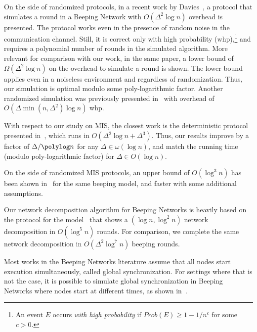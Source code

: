 On the side of randomized protocols, in a recent work by Davies~\cite{davies2023optimal}, a protocol that simulates a \congest round in a Beeping Network with $O(\Delta^2\log n)$ overhead is presented. The protocol works even in the presence of random noise in the communication channel. Still, it is correct only with high probability (whp),\footnote{An event $E$ occurs \emph{with high probability} if $Prob(E)\geq 1-1/n^c$ for some $c>0$.} and requires a polynomial number of \congest rounds in the simulated algorithm.   
More relevant for comparison with our work, in the same paper, a lower bound of $\Omega(\Delta^2 \log n)$ on the overhead to simulate a \congest round is shown. The lower bound applies even in a noiseless environment and regardless of randomization. 
Thus, our simulation is optimal modulo some poly-logarithmic factor. 
%
Another randomized simulation was previously presented in~\cite{ashkenazi2020brief} with overhead of $O(\Delta\min(n,\Delta^2)\log n)$ whp.



With respect to our study on MIS, the closest work is the deterministic protocol presented in~\cite{beauquier2018fast}, which runs in $O(\Delta^2 \log n + \Delta^3)$. Thus, our results improve by a factor of $\Delta/\polylog n$ for any $\Delta\in \omega(\log n)$, and match the running time (modulo poly-logarithmic factor) for $\Delta\in O(\log n)$. 

On the side of randomized MIS protocols, an upper bound of $O(\log^3 n)$ has been shown in~\cite{afek2013beeping} for the same beeping model, and faster with some additional assumptions.

Our network decomposition algorithm for Beeping Networks is heavily based on the protocol for the \congest model~\cite{ghaffari2021improved} that shows a $(\log n, \log^2 n)$ network decomposition in $O(\log^5 n)$ \congest rounds. For comparison, we complete the same network decomposition in $O(\Delta^2 \log^7 n)$ beeping rounds.

Most works in the Beeping Networks literature assume that all nodes start execution simultaneously, called global synchronization. For settings where that is not the case, it is possible to simulate global synchronization in Beeping Networks where nodes start at different times, as shown in~\cite{afek2013beeping,forster2014deterministic,dufoulon2018beeping,hounkanli2020global}.